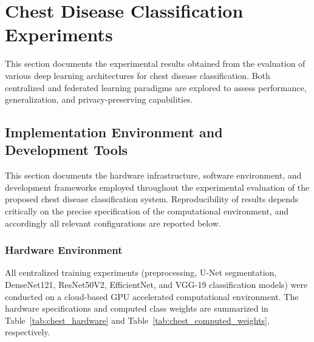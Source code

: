 \renewcommand{\topfraction}{.85}
\renewcommand{\bottomfraction}{.7}
\renewcommand{\textfraction}{.15}
\renewcommand{\floatpagefraction}{.66}
\setcounter{topnumber}{9}
\setcounter{bottomnumber}{9}
\setcounter{totalnumber}{20}

\section{Chest Disease Classification Experiments}

This section documents the experimental results obtained from the evaluation of various deep learning architectures for chest disease classification. Both centralized and federated learning paradigms are explored to assess performance, generalization, and privacy-preserving capabilities.

\subsection{Implementation Environment and Development Tools}

This section documents the hardware infrastructure, software environment, and development frameworks employed throughout the experimental evaluation of the proposed chest disease classification system. Reproducibility of results depends critically on the precise specification of the computational environment, and accordingly all relevant configurations are reported below.

\subsubsection{Hardware Environment}

All centralized training experiments (preprocessing, U-Net segmentation, DenseNet121, ResNet50V2, EfficientNet, and VGG-19 classification models) were conducted on a cloud-based GPU accelerated computational environment. The hardware specifications and computed class weights are summarized in Table~\ref{tab:chest_hardware} and Table~\ref{tab:chest_computed_weights}, respectively.

